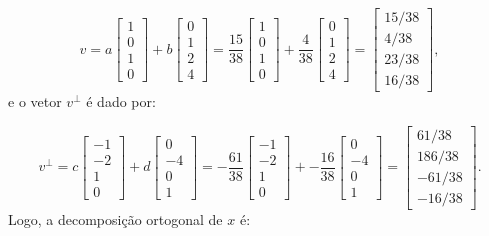 \begin{Example}
	$$
	v = a\begin{bmatrix}
		1 \\
		0 \\
		1 \\
		0
	\end{bmatrix} + b\begin{bmatrix}
		0 \\
		1 \\
		2 \\
		4
	\end{bmatrix} = \dfrac{15}{38}\begin{bmatrix}
		1 \\
		0 \\
		1 \\
		0
	\end{bmatrix} + \dfrac{4}{38}\begin{bmatrix}
		0 \\
		1 \\
		2 \\
		4
	\end{bmatrix} = \begin{bmatrix}
		15/38 \\
		4/38 \\
		23/38 \\
		16/38
	\end{bmatrix},
	$$
	e o vetor $v^\perp$ é dado por:
	
	$$
	v^\perp = c\begin{bmatrix}
		-1 \\
		-2 \\
		1 \\
		0
	\end{bmatrix} + d\begin{bmatrix}
		0 \\
		-4 \\
		0 \\
		1
	\end{bmatrix} = -\dfrac{61}{38}\begin{bmatrix}
		-1 \\
		-2 \\
		1 \\
		0
	\end{bmatrix} + -\dfrac{16}{38}\begin{bmatrix}
		0 \\
		-4 \\
		0 \\
		1
	\end{bmatrix} = \begin{bmatrix}
		61/38 \\
		186/38 \\
		-61/38 \\
		-16/38
	\end{bmatrix}.
	$$
	Logo, a decomposição ortogonal de $x$ é:
	

\end{Example}
